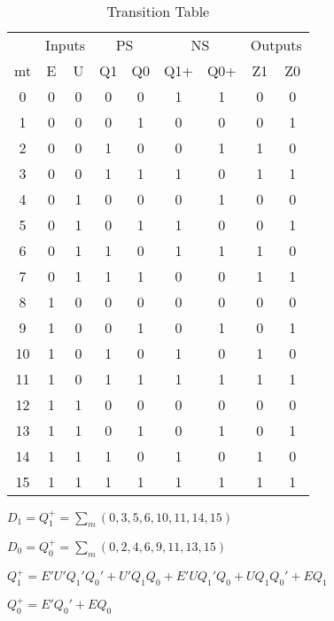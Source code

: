\documentclass{article}
\begin{document}
\begin{table}[hbtp]
  \centering
  \begin{tabular}{c|cc|cc|cc|cc}
 & \multicolumn{2}{c|}{Inputs} & \multicolumn{2}{c|}{PS} & \multicolumn{2}{c|}{NS} & \multicolumn{2}{c}{Outputs} \\
mt & E & U & Q1 & Q0 & Q1+ & Q0+ & Z1 & Z0 \\
\hline
0  & 0 & 0 & 0  & 0  & 1   & 1   & 0  & 0  \\
1  & 0 & 0 & 0  & 1  & 0   & 0   & 0  & 1  \\
2  & 0 & 0 & 1  & 0  & 0   & 1   & 1  & 0  \\
3  & 0 & 0 & 1  & 1  & 1   & 0   & 1  & 1  \\
4  & 0 & 1 & 0  & 0  & 0   & 1   & 0  & 0  \\
5  & 0 & 1 & 0  & 1  & 1   & 0   & 0  & 1  \\
6  & 0 & 1 & 1  & 0  & 1   & 1   & 1  & 0  \\
7  & 0 & 1 & 1  & 1  & 0   & 0   & 1  & 1  \\
8  & 1 & 0 & 0  & 0  & 0   & 0   & 0  & 0  \\
9  & 1 & 0 & 0  & 1  & 0   & 1   & 0  & 1  \\
10 & 1 & 0 & 1  & 0  & 1   & 0   & 1  & 0  \\
11 & 1 & 0 & 1  & 1  & 1   & 1   & 1  & 1  \\
12 & 1 & 1 & 0  & 0  & 0   & 0   & 0  & 0  \\
13 & 1 & 1 & 0  & 1  & 0   & 1   & 0  & 1  \\
14 & 1 & 1 & 1  & 0  & 1   & 0   & 1  & 0  \\
15 & 1 & 1 & 1  & 1  & 1   & 1   & 1  & 1  \\
\end{tabular}
  \caption{\label{tab:values} Transition Table }
\end{table}

$D_1 = Q_1^+ = \sum_m(0,3,5,6,10,11,14,15)$

$D_0 = Q_0^+ = \sum_m(0,2,4,6,9,11,13,15)$

$Q_1^+ = E'U'Q_1'Q_0' + U'Q_1Q_0 + E'UQ_1'Q_0 + UQ_1Q_0' + EQ_1$

$Q_0^+ = E'Q_0' + EQ_0$


\end{document}
